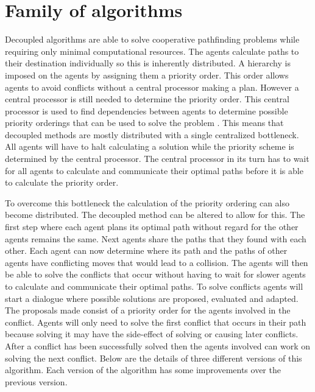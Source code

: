\section{Family of algorithms}\label{sec:method}
Decoupled algorithms are able to solve cooperative pathfinding problems while
requiring only minimal computational resources. The agents calculate paths to
their destination individually so this is inherently distributed. A hierarchy
is imposed on the agents by assigning them a priority order. This order allows
agents to avoid conflicts without a central processor making a plan. However a
central processor is still needed to determine the priority order. This central
processor is used to
find dependencies between agents to determine possible priority orderings that
can be used to solve the problem \cite{latombe1991,bennewitz2002}. This means
that decoupled methods are mostly distributed with a single centralized
bottleneck. All agents will have to halt calculating a solution while the
priority scheme is determined by the central processor. The central processor
in its turn has to wait for all agents to calculate and communicate their
optimal paths before it is able to calculate the priority order.

To overcome this bottleneck the calculation of the priority ordering can also
become distributed. The decoupled method can be
altered to allow for this. The first step where each agent plans its optimal
path without regard for the other agents remains the same. Next agents share
the paths that they found with each other. Each agent can now determine where
its path and the paths of other agents have conflicting moves that would lead 
to a collision. The agents will then be able to solve the conflicts that occur 
without having to wait for slower agents to
calculate and communicate their optimal paths. To solve conflicts agents will
start a dialogue where possible solutions are proposed, evaluated and adapted.
The proposals made consist of a priority order for the agents involved in the
conflict. Agents will only need to solve the first conflict that occurs in
their path because solving it may have the side-effect of solving or causing 
later
conflicts. After a conflict has been successfully solved then the agents
involved can work on solving the next conflict.
Below are the details of three different versions of this algorithm. Each
version of the algorithm has some improvements over the previous version.

